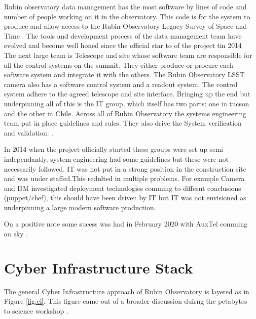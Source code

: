 Rubin observatory  data management \citep{2015arXiv151207914J} has the most software by lines of code and number of people working on it in the observatory. This code is for the system to produce and allow access to the Rubin Observatory Legacy Survey of Space and Time \cite{LSE-163}.
The tools and development process of the data management team have evolved and become well honed since the official star to of the project tin 2014 \citep{2018SPIE10707E..09J}
The next large team is  Telescope and site  \citep{2014SPIE.9145E..1AG} whose software team are responsible for all the control systems on the summit. They either produce or procure each software system and integrate it with the others.
The Rubin Observatory LSST camera \citep{2010SPIE.7735E..0JK} also has a software control system and a readout system. The control system adhere to the agreed telescope and site interface.
 Bringing up the end but underpinning all of this is the IT group, which itself has two parts: one in tucson and the other in Chile.
 Across all of Rubin Observatory the systems engineering team \citep{2014SPIE.9150E..0MC} put in place guidelines and rules. They also drive the  System verification and validation: \citep{2014SPIE.9150E..0NS}.

In 2014 when the project officially started these groups were set up semi independantly, system engineering had some guidelines but these were not necessarily followed. IT was not put in a strong position in the construction site and was under staffed.This redulted in multiple problems. For example Camera and DM investigated deployment technologies comming to differnt conclusions (puppet/chef), this should have been driven by IT but IT was not envisioned as underpinning a large  modern software production.

On a positive note some sucess was had in February 2020 with AuxTel comming on sky \citep{Ingraham20}.


\section {Cyber Infrastructure Stack} \label{sect:cis}

The general Cyber Infrastructure approach of Rubin Observatory is layered as in Figure \ref{fig:ci}.
This figure came out of a broader discussion duirng the petabytes to science workshop \citep{2019arXiv190505116B}.



